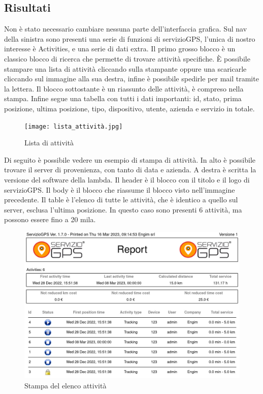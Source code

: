 \documentclass[12pt]{article}
\begin{document}
\subsection{Risultati}
Non è stato necessario cambiare nessuna parte dell'interfaccia grafica.
Sul nav della sinistra sono presenti una serie di funzioni di servizioGPS, 
l'unica di nostro interesse è Activities, e una serie di dati extra. 
Il primo grosso blocco è un classico blocco di ricerca che permette 
di trovare attività specifiche.
È possibile stampare una lista di attività cliccando sulla stampante oppure una 
scaricarle cliccando sul immagine alla sua destra, infine è possibile spedirle 
per mail tramite la lettera. 
Il blocco sottostante è un riassunto delle attività, è compreso nella stampa. 
Infine segue una tabella con tutti i dati importanti: id, stato, 
prima posizione, ultima posizione, tipo, dispositivo, utente, 
azienda e servizio in totale. 
\begin{figure}[H]
\texttt{[image: lista\_attività.jpg]}
\caption{Lista di attività}
\end{figure}
Di seguito è possibile vedere un esempio di stampa di attività. 
In alto è possibile trovare il server di provenienza, con tanto di data e 
azienda.
A destra è scritta la versione del software della lambda. 
Il header è il blocco con il titolo e il logo di servizioGPS.
Il body è il blocco che riassume il blocco visto nell'immagine precedente. 
Il table è l'elenco di tutte le attività, che è identico a quello sul server, 
esclusa l'ultima posizione.
In questo caso sono presenti 6 attività, ma possono essere fino a 20 mila. 
\begin{figure}[H]
\includegraphics[width =\textwidth]{report.png}
\caption{Stampa del elenco attività}
\end{figure}
\end{document}
